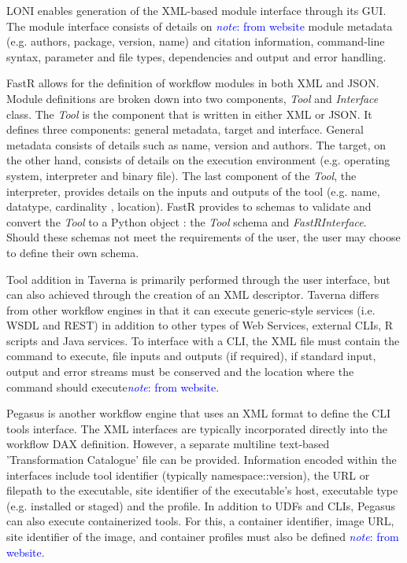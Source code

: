 \documentclass{report}
\newcommand{\note}[1]{\textcolor{blue}{\textit{note}: #1}}
\begin{document}
            LONI enables generation of 
            the XML-based module interface through its GUI. The module interface
            consists of details on \note{from website} module metadata (e.g.
            authors, package, version, name) and citation information, 
            command-line syntax, parameter and file types, dependencies and 
            output and error handling.

            FastR allows for the definition of workflow modules in both XML and 
            JSON. Module definitions are broken down into two components, 
            \textit{Tool} and \textit{Interface} class. The \textit{Tool} is the
            component that is written in either XML or JSON. It defines three
            components: general metadata, target and interface. General metadata
            consists of details such as name, version and authors. The target, 
            on the other hand, consists of details on the execution environment
            (e.g. operating system, interpreter and binary file). The last 
            component of the \textit{Tool}, the interpreter, provides details on
            the inputs and outputs of the tool (e.g. name, datatype, cardinality
            , location). FastR provides to schemas to validate and convert the 
            \textit{Tool} to a Python object
            : the \textit{Tool} schema and \textit{FastRInterface}. Should these
            schemas not meet the requirements of the user, the user may choose 
            to define their own schema.

            Tool addition in Taverna is primarily performed through the user 
            interface, but can also achieved through the creation of an XML
            descriptor. Taverna differs from other workflow engines in that it
            can 
            execute generic-style services (i.e. WSDL and REST) in addition to
            other types of Web Services, external CLIs, R scripts and
            Java services. To interface with a CLI, the XML file must contain 
            the command to execute, file inputs and outputs (if required), if 
            standard input, output and error streams must be conserved and the 
            location where the command should execute\note{from website}.

            Pegasus is another workflow engine that uses an XML format to 
            define the CLI tools interface. The XML interfaces are typically 
            incorporated directly into the workflow DAX definition. However, a 
            separate multiline text-based 'Transformation Catalogue' file can
            be provided. Information encoded within the interfaces include
            tool identifier (typically namespace::version), the URL or filepath
            to the executable, site identifier of the executable's host, 
            executable type (e.g. installed or staged) and the profile. In
            addition to UDFs and CLIs, Pegasus
            can also execute containerized tools. For this, a container 
            identifier, image URL, site identifier of the image, and container
            profiles must also be defined \note{from website}.
\end{document}
